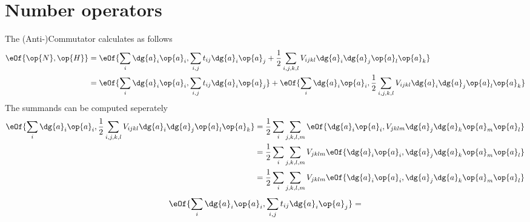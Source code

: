 \section{Number operators}
The (Anti-)Commutator calculates as follows
\begin{align}
	\eOf{\op{N},\op{H}} & = \eOf{\sum\limits_i \dg{a}_i \op{a}_i,\sum\limits_{i,j} t_{ij}\dg{a}_i \op{a}_j + \frac{1}{2}\sum\limits_{i,j,k,l}V_{ijkl}\dg{a}_i\dg{a}_j\op{a}_l\op{a}_k} \\
	& = \eOf{\sum\limits_i \dg{a}_i \op{a}_i,\sum\limits_{i,j} t_{ij}\dg{a}_i \op{a}_j} + \eOf{\sum\limits_i \dg{a}_i \op{a}_i,\frac{1}{2}\sum\limits_{i,j,k,l}V_{ijkl}\dg{a}_i\dg{a}_j\op{a}_l\op{a}_k} \\
\end{align}
The summands can be computed seperately
\begin{align}
	\eOf{\sum\limits_i \dg{a}_i \op{a}_i,\frac{1}{2}\sum\limits_{i,j,k,l}V_{ijkl}\dg{a}_i\dg{a}_j\op{a}_l\op{a}_k} & = \frac{1}{2}\sum\limits_i\sum\limits_{j,k,l,m}\eOf{\dg{a}_i\op{a}_i,V_{jklm}\dg{a}_j\dg{a}_k\op{a}_m\op{a}_l}\\
	& = \frac{1}{2}\sum\limits_i\sum\limits_{j,k,l,m}V_{jklm} \eOf{\dg{a}_i\op{a}_i,\dg{a}_j\dg{a}_k\op{a}_m\op{a}_l} \\
	& = \frac{1}{2}\sum\limits_i\sum\limits_{j,k,l,m}V_{jklm} \eOf{\dg{a}_i\op{a}_i,\dg{a}_j\dg{a}_k\op{a}_m\op{a}_l} 
\end{align}
\begin{align}
	\eOf{\sum\limits_i \dg{a}_i \op{a}_i,\sum\limits_{i,j} t_{ij}\dg{a}_i \op{a}_j} & = \\
\end{align}
